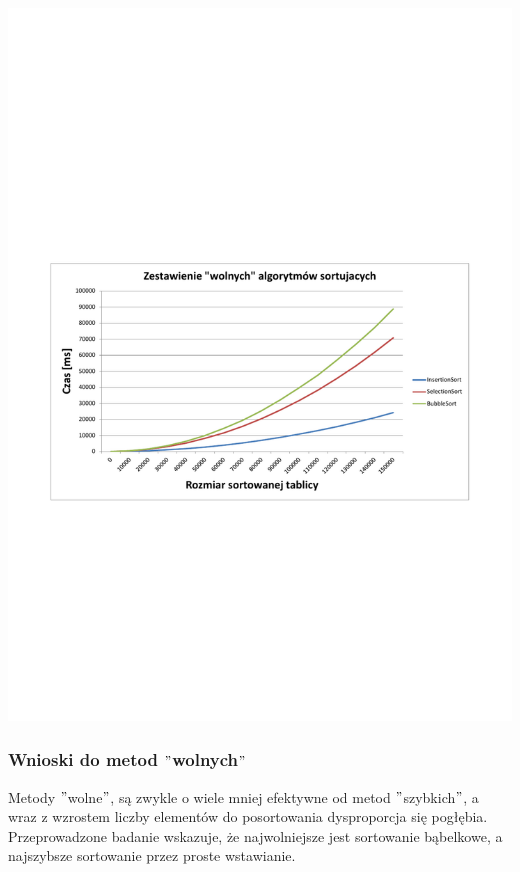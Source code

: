 \documentclass[polish,polish,a4paper]{article}
\begin{document}
\begin{spacing}{1.5}
	\begin{minipage}[H]{\textwidth}
		\begin{center}
					\includegraphics[scale=0.85]{zad2wolne.pdf}
					\label{fig:zad2wolne}
		\end{center}
	\end{minipage}

\subsubsection{Wnioski do metod $"$wolnych$"$}

Metody $"$wolne$"$, są zwykle o wiele mniej efektywne od metod $"$szybkich$"$, a wraz z wzrostem liczby elementów do posortowania dysproporcja się pogłębia. Przeprowadzone badanie wskazuje, że najwolniejsze jest sortowanie bąbelkowe, a najszybsze sortowanie przez proste wstawianie.
	

\end{spacing}
\end{document}
